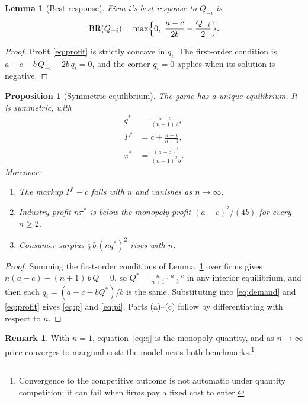 \documentclass[11pt]{article}
\newtheorem{proposition}{Proposition}
\newtheorem{lemma}{Lemma}
\theoremstyle{definition}
\newtheorem{remark}{Remark}
\newcommand{\BR}{\mathrm{BR}}
\newcommand{\qstar}{q^{*}}
\begin{document}
\begin{lemma}[Best response]\label{lem:br}
Firm $i$'s best response to $Q_{-i}$ is
\begin{equation}\label{eq:br}
  \BR(Q_{-i}) = \max\Bigl\{0,\ \frac{a-c}{2b} - \frac{Q_{-i}}{2}\Bigr\}.
\end{equation}
\end{lemma}

\begin{proof}
Profit \eqref{eq:profit} is strictly concave in $q_i$. The first-order condition is $a - c - b\,Q_{-i} - 2b\,q_i = 0$, and the corner $q_i=0$ applies when its solution is negative.
\end{proof}

\begin{proposition}[Symmetric equilibrium]\label{prop:eq}
The game has a unique equilibrium. It is symmetric, with
\begin{align}
  \qstar  &= \frac{a-c}{(n+1)\,b}, \label{eq:q} \\
  P^{*}   &= c + \frac{a-c}{n+1}, \label{eq:p} \\
  \pi^{*} &= \frac{(a-c)^{2}}{(n+1)^{2}\,b}. \label{eq:pi}
\end{align}
Moreover:
\begin{enumerate}
  \item[(a)] The markup $P^{*}-c$ falls with $n$ and vanishes as $n\to\infty$.
  \item[(b)] Industry profit $n\pi^{*}$ is below the monopoly profit $(a-c)^{2}/(4b)$ for every $n\ge 2$.
  \item[(c)] Consumer surplus $\tfrac12\, b\,(n\qstar)^{2}$ rises with $n$.
\end{enumerate}
\end{proposition}

\begin{proof}
Summing the first-order conditions of Lemma~\ref{lem:br} over firms gives $n(a-c) - (n+1)\,b\,Q = 0$, so $Q^{*} = \frac{n}{n+1}\cdot\frac{a-c}{b}$ in any interior equilibrium, and then each $q_i = (a - c - bQ^{*})/b$ is the same. Substituting into \eqref{eq:demand} and \eqref{eq:profit} gives \eqref{eq:p} and \eqref{eq:pi}. Parts (a)--(c) follow by differentiating with respect to $n$.
\end{proof}

\begin{remark}
With $n=1$, equation~\eqref{eq:q} is the monopoly quantity, and as $n\to\infty$ price converges to marginal cost: the model nests both benchmarks.\footnote{Convergence to the competitive outcome is not automatic under quantity competition; it can fail when firms pay a fixed cost to enter.}
\end{remark}
\end{document}
